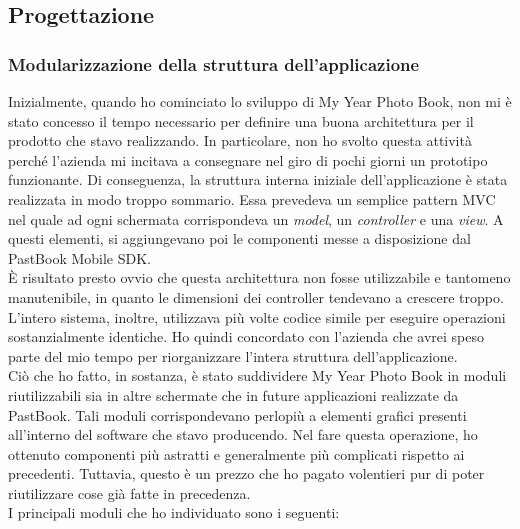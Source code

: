 		\subsection{Progettazione}
			\subsubsection{Modularizzazione della struttura dell'applicazione}
				Inizialmente, quando ho cominciato lo sviluppo di My Year Photo Book, non mi è stato concesso il tempo necessario per
				definire una buona architettura per il prodotto che stavo realizzando. In particolare, non ho svolto questa attività
				perché l'azienda mi incitava a consegnare nel giro di pochi giorni un prototipo funzionante. Di conseguenza, la
				struttura interna iniziale dell'applicazione è stata realizzata in modo troppo sommario. Essa prevedeva un semplice
				pattern MVC nel quale ad ogni schermata corrispondeva un \emph{model}, un \emph{controller} e una \emph{view}. A
				questi elementi, si aggiungevano poi le componenti messe a disposizione dal PastBook Mobile SDK.\\
				È risultato presto ovvio che questa architettura non fosse utilizzabile e tantomeno manutenibile, in quanto le
				dimensioni dei controller tendevano a crescere troppo. L'intero sistema, inoltre, utilizzava più volte codice simile
				per eseguire operazioni sostanzialmente identiche. Ho quindi concordato con l'azienda che avrei speso parte del mio
				tempo per riorganizzare l'intera struttura dell'applicazione.\\
				Ciò che ho fatto, in sostanza, è stato suddividere My Year Photo Book in moduli riutilizzabili sia in altre schermate
				che in future applicazioni realizzate da PastBook. Tali moduli corrispondevano perlopiù a elementi grafici presenti
				all'interno del software che stavo producendo. Nel fare questa operazione, ho ottenuto componenti più astratti e
				generalmente più complicati rispetto ai precedenti. Tuttavia, questo è un prezzo che ho pagato volentieri pur di
				poter riutilizzare cose già fatte in precedenza.\\
				I principali moduli che ho individuato sono i seguenti:
